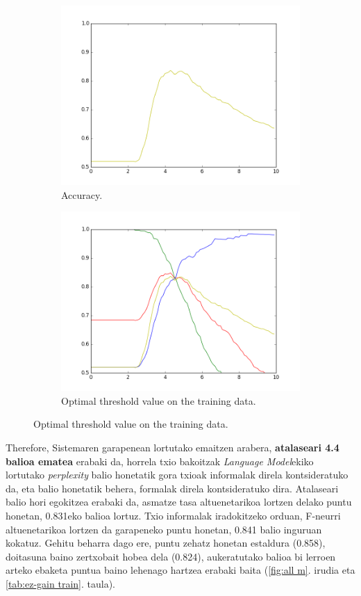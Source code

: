 \documentclass[information,article,submit,moreauthors,pdftex,10pt,a4paper]{Definitions/mdpi}
\begin{document}
\begin{figure}[H]
\begin{subfigure}[b]{0.48\linewidth}
    \includegraphics[width=\linewidth]{accuracy}
    \caption{Accuracy.}\label{fig:acc}
  \end{subfigure}
  \begin{subfigure}[b]{0.48\linewidth}
    \includegraphics[width=\linewidth]{denaperp}
    \caption{Optimal threshold value on the training data.}\label{fig:threshold}
  \end{subfigure}
\end{figure}

Therefore, Sistemaren garapenean lortutako emaitzen arabera, \textbf{atalaseari 4.4 balioa ematea} erabaki da, horrela txio bakoitzak \textit{Language Model}ekiko lortutako \textit{perplexity} balio honetatik gora txioak informalak direla kontsideratuko da, eta balio honetatik behera, formalak direla kontsideratuko dira. Atalaseari balio hori egokitzea erabaki da, asmatze tasa altuenetarikoa lortzen delako puntu honetan, 0.831eko balioa lortuz. Txio informalak iradokitzeko orduan, F-neurri altuenetarikoa lortzen da garapeneko puntu honetan, 0.841 balio inguruan kokatuz. Gehitu beharra dago ere, puntu zehatz honetan estaldura (0.858), doitasuna baino zertxobait hobea dela (0.824), aukeratutako balioa bi lerroen arteko ebaketa puntua baino lehenago hartzea erabaki baita (\ref{fig:all m}. irudia eta \ref{tab:ez-gain train}. taula).
\end{document}
